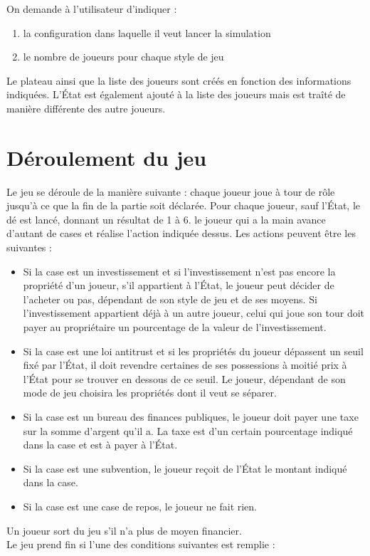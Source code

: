 \documentclass[11pt, a4paper]{report}
\begin{document}
	On demande à l'utilisateur d'indiquer :
	
	\begin{enumerate}
		
		\item la configuration dans laquelle il veut lancer la simulation
		
		\item le nombre de joueurs pour chaque style de jeu
		
	\end{enumerate}
	
	Le plateau ainsi que la liste des joueurs sont créés en fonction des informations indiquées. L'État est également ajouté à la liste des joueurs mais est traîté de manière différente des autre joueurs.
	
	\section{Déroulement du jeu}

	Le jeu se déroule de la manière suivante : chaque joueur joue à tour de rôle jusqu'à ce que la fin de la partie soit déclarée. Pour chaque joueur, sauf l'État, le dé est lancé, donnant un résultat de 1 à 6. le joueur qui a la main avance d'autant de cases et réalise l'action indiquée dessus. Les actions peuvent être les suivantes :

	\begin{itemize}
		
		\item Si la case est un investissement et si l'investissement n'est pas encore la propriété d'un joueur, s'il appartient à l'État, le joueur peut décider de l'acheter ou pas, dépendant de son style de jeu et de ses moyens. Si l'investissement appartient déjà à un autre joueur, celui qui joue son tour doit payer au propriétaire un pourcentage de la valeur de l'investissement.
		
		\item Si la case est une loi antitrust et si les propriétés du joueur dépassent un seuil fixé par l'État, il doit revendre certaines de ses possessions à moitié prix à l'État pour se trouver en dessous de ce seuil. Le joueur, dépendant de son mode de jeu choisira les propriétés dont il veut se séparer.
		
		\item Si la case est un bureau des finances publiques, le joueur doit payer une taxe sur la somme d'argent qu'il a. La taxe est d'un certain pourcentage indiqué dans la case et est à payer à l'État.
		
		\item Si la case est une subvention, le joueur reçoit de l'État le montant indiqué dans la case.
		
		\item Si la case est une case de repos, le joueur ne fait rien.
		
	\end{itemize}
	Un joueur sort du jeu s'il n'a plus de moyen financier.\\
	Le jeu prend fin si l'une des conditions suivantes est remplie :
	
\end{document}
